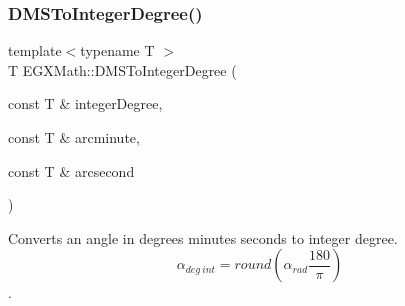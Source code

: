 \subsubsection{\texorpdfstring{D\+M\+S\+To\+Integer\+Degree()}{DMSToIntegerDegree()}}
{\footnotesize\ttfamily template$<$typename T $>$ \\
T E\+G\+X\+Math\+::\+D\+M\+S\+To\+Integer\+Degree (\begin{DoxyParamCaption}\item[{const T \&}]{integer\+Degree,  }\item[{const T \&}]{arcminute,  }\item[{const T \&}]{arcsecond }\end{DoxyParamCaption})}



Converts an angle in degrees minutes seconds to integer degree. \[\alpha_{deg\ int}=round(\alpha_{rad}\frac{180}{\pi})\]. 

